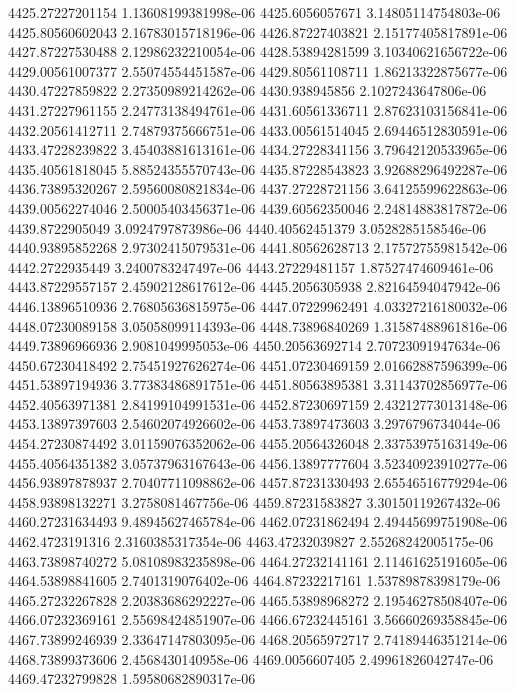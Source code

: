 {4425.27227201154 1.13608199381998e-06
4425.6056057671 3.14805114754803e-06
4425.80560602043 2.16783015718196e-06
4426.87227403821 2.15177405817891e-06
4427.87227530488 2.12986232210054e-06
4428.53894281599 3.10340621656722e-06
4429.00561007377 2.55074554451587e-06
4429.80561108711 1.86213322875677e-06
4430.47227859822 2.27350989214262e-06
4430.938945856 2.1027243647806e-06
4431.27227961155 2.24773138494761e-06
4431.60561336711 2.87623103156841e-06
4432.20561412711 2.74879375666751e-06
4433.00561514045 2.69446512830591e-06
4433.47228239822 3.45403881613161e-06
4434.27228341156 3.79642120533965e-06
4435.40561818045 5.88524355570743e-06
4435.87228543823 3.92688296492287e-06
4436.73895320267 2.59560080821834e-06
4437.27228721156 3.64125599622863e-06
4439.00562274046 2.50005403456371e-06
4439.60562350046 2.24814883817872e-06
4439.8722905049 3.0924797873986e-06
4440.40562451379 3.0528285158546e-06
4440.93895852268 2.97302415079531e-06
4441.80562628713 2.17572755981542e-06
4442.2722935449 3.2400783247497e-06
4443.27229481157 1.87527474609461e-06
4443.87229557157 2.45902128617612e-06
4445.2056305938 2.82164594047942e-06
4446.13896510936 2.76805636815975e-06
4447.07229962491 4.03327216180032e-06
4448.07230089158 3.05058099114393e-06
4448.73896840269 1.31587488961816e-06
4449.73896966936 2.9081049995053e-06
4450.20563692714 2.70723091947634e-06
4450.67230418492 2.75451927626274e-06
4451.07230469159 2.01662887596399e-06
4451.53897194936 3.77383486891751e-06
4451.80563895381 3.31143702856977e-06
4452.40563971381 2.84199104991531e-06
4452.87230697159 2.43212773013148e-06
4453.13897397603 2.54602074926602e-06
4453.73897473603 3.2976796734044e-06
4454.27230874492 3.01159076352062e-06
4455.20564326048 2.33753975163149e-06
4455.40564351382 3.05737963167643e-06
4456.13897777604 3.52340923910277e-06
4456.93897878937 2.70407711098862e-06
4457.87231330493 2.65546516779294e-06
4458.93898132271 3.2758081467756e-06
4459.87231583827 3.30150119267432e-06
4460.27231634493 9.48945627465784e-06
4462.07231862494 2.49445699751908e-06
4462.4723191316 2.3160385317354e-06
4463.47232039827 2.55268242005175e-06
4463.73898740272 5.08108983235898e-06
4464.27232141161 2.11461625191605e-06
4464.53898841605 2.7401319076402e-06
4464.87232217161 1.53789878398179e-06
4465.27232267828 2.20383686292227e-06
4465.53898968272 2.19546278508407e-06
4466.07232369161 2.55698424851907e-06
4466.67232445161 3.56660269358845e-06
4467.73899246939 2.33647147803095e-06
4468.20565972717 2.74189446351214e-06
4468.73899373606 2.4568430140958e-06
4469.0056607405 2.49961826042747e-06
4469.47232799828 1.59580682890317e-06
}
